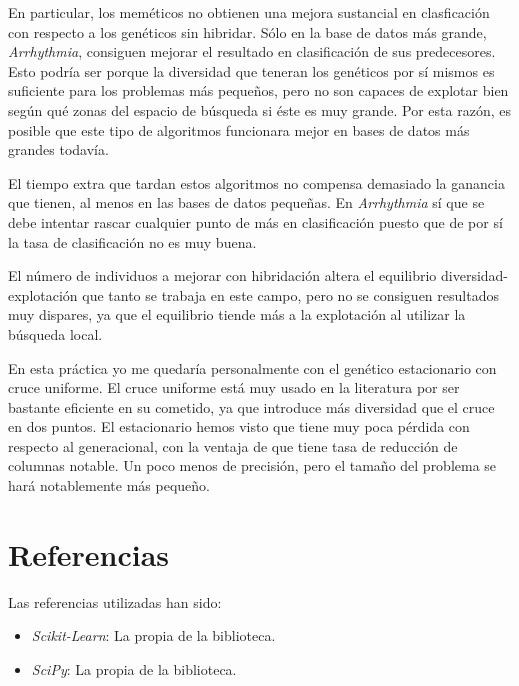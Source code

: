 \documentclass[a4paper, 11pt]{article}
\begin{document}
    En particular, los meméticos no obtienen una mejora sustancial en clasficación con respecto a los genéticos sin hibridar. Sólo en la base de datos más grande, \emph{Arrhythmia}, consiguen mejorar el resultado en clasificación de sus predecesores. Esto podría ser porque la diversidad que teneran los genéticos por sí mismos es suficiente para los problemas más pequeños, pero no son capaces de explotar bien según qué zonas del espacio de búsqueda si éste es muy grande. Por esta razón, es posible que este tipo de algoritmos funcionara mejor en bases de datos más grandes todavía.

    El tiempo extra que tardan estos algoritmos no compensa demasiado la ganancia que tienen, al menos en las bases de datos pequeñas. En \emph{Arrhythmia} sí que se debe intentar rascar cualquier punto de más en clasificación puesto que de por sí la tasa de clasificación no es muy buena.

    El número de individuos a mejorar con hibridación altera el equilibrio diversidad-explotación que tanto se trabaja en este campo, pero no se consiguen resultados muy dispares, ya que el equilibrio tiende más a la explotación al utilizar la búsqueda local.

    En esta práctica yo me quedaría personalmente con el genético estacionario con cruce uniforme. El cruce uniforme está muy usado en la literatura por ser bastante eficiente en su cometido, ya que introduce más diversidad que el cruce en dos puntos. El estacionario hemos visto que tiene muy poca pérdida con respecto al generacional, con la ventaja de que tiene tasa de reducción de columnas notable. Un poco menos de precisión, pero el tamaño del problema se hará notablemente más pequeño.

  \newpage
  \section{Referencias}

  Las referencias utilizadas han sido:
  \begin{itemize}
    \item \emph{Scikit-Learn}: La propia  de la biblioteca.
    \item \emph{SciPy}: La propia  de la biblioteca.
  \end{itemize}
\end{document}
